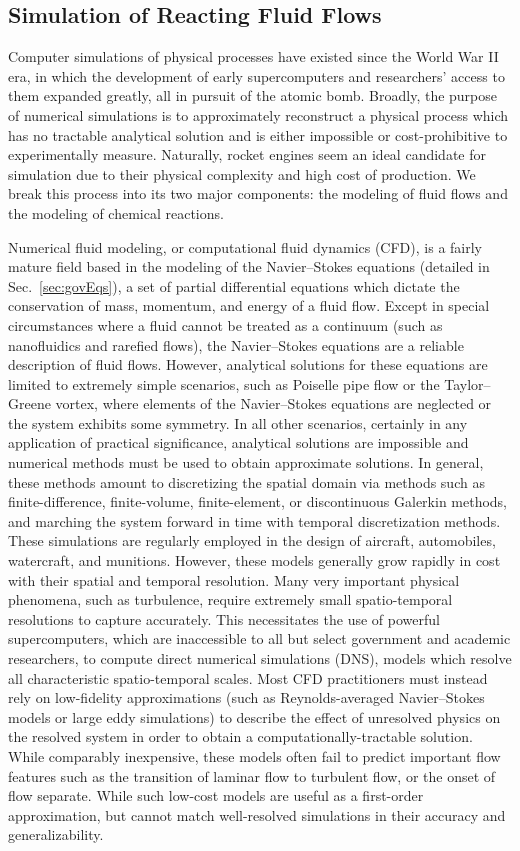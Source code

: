 \subsection{Simulation of Reacting Fluid Flows}

Computer simulations of physical processes have existed since the World War II era, in which the development of early supercomputers and researchers' access to them expanded greatly, all in pursuit of the atomic bomb. Broadly, the purpose of numerical simulations is to approximately reconstruct a physical process which has no tractable analytical solution and is either impossible or cost-prohibitive to experimentally measure. Naturally, rocket engines seem an ideal candidate for simulation due to their physical complexity and high cost of production. We break this process into its two major components: the modeling of fluid flows and the modeling of chemical reactions.

Numerical fluid modeling, or computational fluid dynamics (CFD), is a fairly mature field based in the modeling of the Navier--Stokes equations (detailed in Sec.~\ref{sec:govEqs}), a set of partial differential equations which dictate the conservation of mass, momentum, and energy of a fluid flow. Except in special circumstances where a fluid cannot be treated as a continuum (such as nanofluidics and rarefied flows), the Navier--Stokes equations are a reliable description of fluid flows. However, analytical solutions for these equations are limited to extremely simple scenarios, such as Poiselle pipe flow or the Taylor--Greene vortex, where elements of the Navier--Stokes equations are neglected or the system exhibits some symmetry. In all other scenarios, certainly in any application of practical significance, analytical solutions are impossible and numerical methods must be used to obtain approximate solutions. In general, these methods amount to discretizing the spatial domain via methods such as finite-difference, finite-volume, finite-element, or discontinuous Galerkin methods, and marching the system forward in time with temporal discretization methods. These simulations are regularly employed in the design of aircraft, automobiles, watercraft, and munitions. However, these models generally grow rapidly in cost with their spatial and temporal resolution. Many very important physical phenomena, such as turbulence, require extremely small spatio-temporal resolutions to capture accurately. This necessitates the use of powerful supercomputers, which are inaccessible to all but select government and academic researchers, to compute direct numerical simulations (DNS), models which resolve all characteristic spatio-temporal scales. Most CFD practitioners must instead rely on low-fidelity approximations (such as Reynolds-averaged Navier--Stokes models or large eddy simulations) to describe the effect of unresolved physics on the resolved system in order to obtain a computationally-tractable solution. While comparably inexpensive, these models often fail to predict important flow features such as the transition of laminar flow to turbulent flow, or the onset of flow separate. While such low-cost models are useful as a first-order approximation, but cannot match well-resolved simulations in their accuracy and generalizability. 

